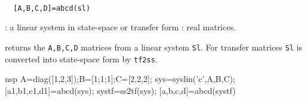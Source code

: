 \begin{mandesc}
   \\ %
\end{mandesc}
\begin{calling_sequence}
\begin{verbatim}
  [A,B,C,D]=abcd(sl)  
\end{verbatim}
\end{calling_sequence}
\begin{parameters}
  \begin{varlist}
    : a linear system in state-space or transfer form
    : real matrices.
  \end{varlist}
\end{parameters}
\begin{mandescription}
  returns the \verb!A,B,C,D! matrices from a linear system \verb!Sl!.
  For transfer matrices \verb!Sl! is converted
  into state-space form by \verb!tf2ss!.
\end{mandescription}
\begin{examples}
  \begin{mintednsp}{nsp}
    A=diag([1,2,3]);B=[1;1;1];C=[2,2,2];
    sys=syslin('c',A,B,C);
    [a1,b1,c1,d1]=abcd(sys);
    systf=ss2tf(sys);
    [a,b,c,d]=abcd(systf)
  \end{mintednsp}
\end{examples}
\begin{manseealso}
     
\end{manseealso}
